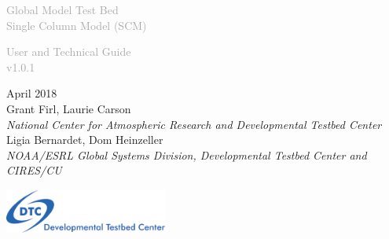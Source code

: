 \begin{titlepage}
\renewcommand{\thefootnote}{\fnsymbol{footnote}}

\vspace*{1em}
\noindent

\begin{center}
\textcolor{darkgray}{\bigsf Global Model Test Bed\\[0.5ex] Single Column Model (SCM)}
\vspace*{1em}\par

\textcolor{darkgray}{\bigst User and Technical Guide\\[0.5ex] v1.0.1}
\vspace*{1em}\par

\large{April 2018}\\[4em]

Grant Firl, Laurie Carson\\
\textit{\small{National Center for Atmospheric Research and Developmental Testbed Center}}\\[4em]

Ligia Bernardet, Dom Heinzeller\\
\textit{\small{NOAA/ESRL Global Systems Division, Developmental Testbed Center and CIRES/CU}}\\[4em]

\vspace{4em}

\includegraphics[width=0.4\textwidth]{images/dtc_logo.png}\\[2em]

\end{center}
\end{titlepage}
\pagebreak{}
